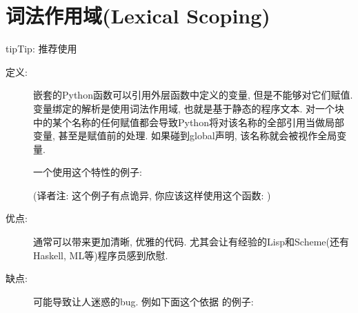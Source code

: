 \documentclass[a4paper,10pt,english]{sphinxmanual}
\begin{document}
\section{词法作用域(Lexical Scoping)}
\label{\detokenize{python_language_rules:lexical-scoping}}
\begin{sphinxadmonition}{tip}{Tip:}
推荐使用
\end{sphinxadmonition}
\begin{description}
\item[{定义:}] \leavevmode
嵌套的Python函数可以引用外层函数中定义的变量, 但是不能够对它们赋值. 变量绑定的解析是使用词法作用域, 也就是基于静态的程序文本. 对一个块中的某个名称的任何赋值都会导致Python将对该名称的全部引用当做局部变量, 甚至是赋值前的处理. 如果碰到global声明, 该名称就会被视作全局变量.

一个使用这个特性的例子:

%
\begin{sphinxVerbatim}[commandchars=\\\{\}]
 
     
           

     
\end{sphinxVerbatim}

(译者注: 这个例子有点诡异, 你应该这样使用这个函数:  )

\item[{优点:}] \leavevmode
通常可以带来更加清晰, 优雅的代码. 尤其会让有经验的Lisp和Scheme(还有Haskell, ML等)程序员感到欣慰.

\item[{缺点:}] \leavevmode
可能导致让人迷惑的bug. 例如下面这个依据  的例子:

%
\begin{sphinxVerbatim}[commandchars=\\\{\}]
  
 
     
         
         
         
\end{sphinxVerbatim}


\end{description}
\end{document}
